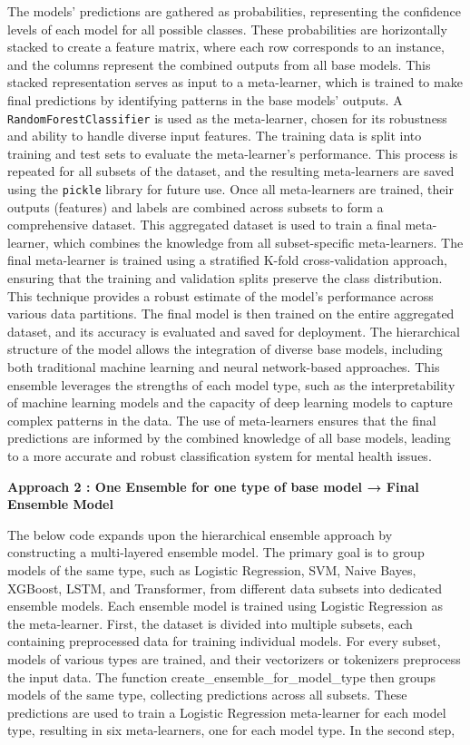 \noindent
The models' predictions are gathered as probabilities, representing the confidence levels of each model for all possible classes. These probabilities are horizontally stacked to create a feature matrix, where each row corresponds to an instance, and the columns represent the combined outputs from all base models. This stacked representation serves as input to a meta-learner, which is trained to make final predictions by identifying patterns in the base models' outputs. A \texttt{RandomForestClassifier} is used as the meta-learner, chosen for its robustness and ability to handle diverse input features. The training data is split into training and test sets to evaluate the meta-learner's performance. This process is repeated for all subsets of the dataset, and the resulting meta-learners are saved using the \texttt{pickle} library for future use. Once all meta-learners are trained, their outputs (features) and labels are combined across subsets to form a comprehensive dataset. This aggregated dataset is used to train a final meta-learner, which combines the knowledge from all subset-specific meta-learners. The final meta-learner is trained using a stratified K-fold cross-validation approach, ensuring that the training and validation splits preserve the class distribution. This technique provides a robust estimate of the model's performance across various data partitions. The final model is then trained on the entire aggregated dataset, and its accuracy is evaluated and saved for deployment. The hierarchical structure of the model allows the integration of diverse base models, including both traditional machine learning and neural network-based approaches. This ensemble leverages the strengths of each model type, such as the interpretability of machine learning models and the capacity of deep learning models to capture complex patterns in the data. The use of meta-learners ensures that the final predictions are informed by the combined knowledge of all base models, leading to a more accurate and robust classification system for mental health issues.

\vspace{2em}

\noindent
\textbf{Approach 2 : One Ensemble for one type of base model → Final Ensemble Model}

\noindent
The below code expands upon the hierarchical ensemble approach by constructing a multi-layered ensemble model. The primary goal is to group models of the same type, such as Logistic Regression, SVM, Naive Bayes, XGBoost, LSTM, and Transformer, from different data subsets into dedicated ensemble models. Each ensemble model is trained using Logistic Regression as the meta-learner. First, the dataset is divided into multiple subsets, each containing preprocessed data for training individual models. For every subset, models of various types are trained, and their vectorizers or tokenizers preprocess the input data. The function create\_ensemble\_for\_model\_type then groups models of the same type, collecting predictions across all subsets. These predictions are used to train a Logistic Regression meta-learner for each model type, resulting in six meta-learners, one for each model type. In the second step,

